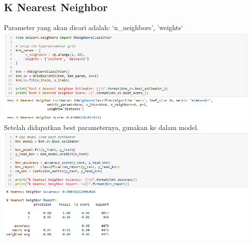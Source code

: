 \documentclass[12pt]{article}
\begin{document}
    \newpage
    
    \subsection{K Nearest Neighbor}
    \newline
    \newline Parameter yang akan dicari adalah: `n\_neighbors', 'weights`
    \newline \includegraphics[scale=0.535]{knn-tune.png}
    \newline
    \newline Setelah didapatkan best parameternya, gunakan ke dalam model.
    \newline \includegraphics[scale=0.535]{knn-model.png}
    
    \newpage
    
\end{document}
